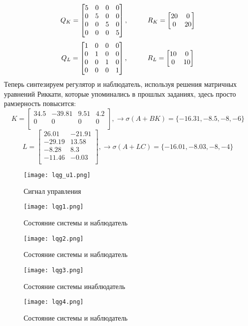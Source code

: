 $$
  Q_K = \begin{bmatrix}
    5 & 0 & 0 & 0 \\
    0 & 5 & 0 & 0 \\
    0 & 0 & 5 & 0 \\
    0 & 0 & 0 & 5 \\
\end{bmatrix}, \hspace*{1cm}
R_K = \begin{bmatrix}
    20 & 0 \\
    0 & 20 \\
\end{bmatrix}
$$
$$
Q_L = \begin{bmatrix}
  1 & 0 & 0 & 0 \\
  0 & 1 & 0 & 0 \\
  0 & 0 & 1 & 0 \\
  0 & 0 & 0 & 1 \\
\end{bmatrix}, \hspace*{1cm}
R_L = \begin{bmatrix}
  10 & 0 \\
  0 & 10 \\
\end{bmatrix}
$$
Теперь синтезируем регулятор и наблюдатель, используя решения матричных уравнений Риккати, которые упоминались в прошлых заданиях, 
здесь просто рамзерность повысится:
$$
  K = \begin{bmatrix}
    34.5 & -39.81 & 9.51 & 4.2 \\
    0 & 0 & 0 & 0 \\
\end{bmatrix}, \rightarrow \sigma(A+BK)=\{ -16.31, -8.5, -8, -6 \} 
$$
$$
  L = \begin{bmatrix}
    26.01 & -21.91 \\
    -29.19 & 13.58 \\
    -8.28 & 8.3 \\
    -11.46 & -0.03 \\
\end{bmatrix}, \rightarrow \sigma(A+LC)=\{ -16.01, -8.03, -8, -4 \}
$$

\newpage
\begin{figure}[ht]
  \centering
  \texttt{[image: lqg\_u1.png]}
  \caption{Сигнал управления}
\end{figure}
\begin{figure}[ht]
  \centering
  \texttt{[image: lqg1.png]}
  \caption{Состояние системы и наблюдатель}
\end{figure}
\newpage
\begin{figure}[ht]
  \centering
  \texttt{[image: lqg2.png]}
  \caption{Состояние системы и наблюдатель }
\end{figure}
\begin{figure}[ht]
  \centering
  \texttt{[image: lqg3.png]}
  \caption{Состояние системы инаблюдатель}
\end{figure}
\newpage
\begin{figure}[ht]
  \centering
  \texttt{[image: lqg4.png]}
  \caption{Состояние системы и наблюдатель}
\end{figure}

